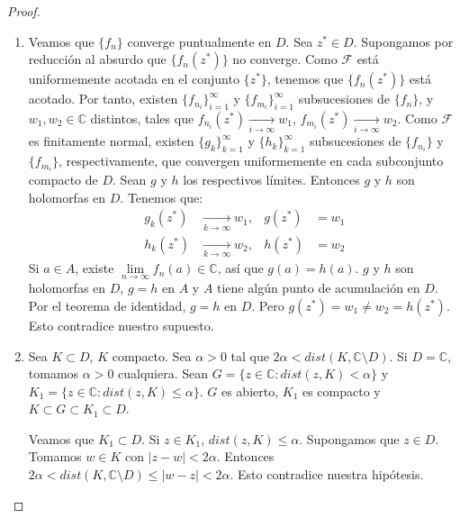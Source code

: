 \begin{proof}
    \hfill
    \begin{enumerate}
        \item Veamos que $\{f_n\}$ converge puntualmente en $D$.
              Sea $z^\ast \in D$.
              Supongamos por reducción al absurdo que $\{f_n(z^\ast)\}$ no converge.
              Como $\mathcal{F}$ está uniformemente acotada en el conjunto $\{z^\ast\}$, tenemos que $\{f_n(z^\ast)\}$ está acotado.
              Por tanto, existen $\{f_{n_i}\}_{i=1}^\infty$ y $\{f_{m_i}\}_{i=1}^\infty$ subsucesiones de $\{f_n\}$, y $w_1, w_2 \in \mathbb{C}$ distintos, tales que $f_{n_i}(z^\ast) \xrightarrow[i \to \infty]{} w_1$, $f_{m_i}(z^\ast) \xrightarrow[i \to \infty]{} w_2$.
              Como $\mathcal{F}$ es finitamente normal, existen $\{g_k\}_{k=1}^\infty$ y $\{h_k\}_{k=1}^\infty$ subsucesiones de $\{f_{n_i}\}$ y $\{f_{m_i}\}$, respectivamente, que convergen uniformemente en cada subconjunto compacto de $D$.
              Sean $g$ y $h$ los respectivos límites.
              Entonces $g$ y $h$ son holomorfas en $D$.
              Tenemos que:
              \begin{align*}
                  g_k(z^\ast) & \xrightarrow[k \to \infty]{} w_1, & g(z^\ast) & = w_1 \\
                  h_k(z^\ast) & \xrightarrow[k \to \infty]{} w_2, & h(z^\ast) & = w_2
              \end{align*}
              Si $a \in A$, existe $\lim\limits_{n \to \infty} f_n(a) \in \mathbb{C}$, así que $g(a) = h(a)$.
              $g$ y $h$ son holomorfas en $D$, $g = h$ en $A$ y $A$ tiene algún punto de acumulación en $D$.
              Por el teorema de identidad, $g = h$ en $D$.
              Pero $g(z^\ast) = w_1 \neq w_2 = h(z^\ast)$.
              Esto contradice nuestro supuesto.

        \item Sea $K \subset D$, $K$ compacto.
              Sea $\alpha > 0$ tal que $2\alpha < dist(K, \mathbb{C} \setminus D)$.
              Si $D = \mathbb{C}$, tomamos $\alpha > 0$ cualquiera.
              Sean $G = \{z \in \mathbb{C} : dist(z, K) < \alpha\}$ y $K_1 = \{z \in \mathbb{C} : dist(z, K) \leq \alpha\}$.
              $G$ es abierto, $K_1$ es compacto y $K \subset G \subset K_1 \subset D$.

              Veamos que $K_1 \subset D$.
              Si $z \in K_1$, $dist(z, K) \leq \alpha$.
              Supongamos que $z \in D$.
              Tomamos $w \in K$ con $|z-w| < 2\alpha$.
              Entonces $2\alpha < dist(K, \mathbb{C} \setminus D) \leq |w-z| < 2\alpha$.
              Esto contradice nuestra hipótesis.


\end{enumerate}
\end{proof}
